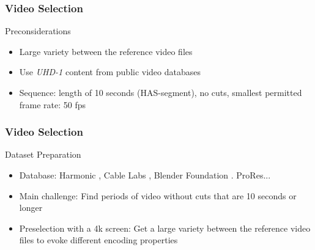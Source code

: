 \begin{frame}
\frametitle{Video Selection}
\large{Preconsiderations}

\begin{itemize}
\item Large variety between the reference video files
\item Use \textit{UHD-1} content from public video databases 
\item Sequence: length of 10 seconds (HAS-segment), no cuts, smallest permitted frame rate: 50 fps
\end{itemize}

\end{frame}


\begin{frame}
\frametitle{Video Selection}
\large{Dataset Preparation}

\begin{itemize}
\item Database: Harmonic \cite{web:harmonic}, Cable Labs \cite{web:cablelabs}, Blender Foundation \cite{web:bbb}. ProRes...
\item Main challenge: Find periods of video without cuts that are 10 seconds or longer
\item Preselection with a 4k screen: Get a large variety between the reference video files to evoke different encoding properties

\end{itemize}

\begin{figure}[hbt!]
	\begin{center}
		

\end{center}
\end{figure}
\end{frame}
